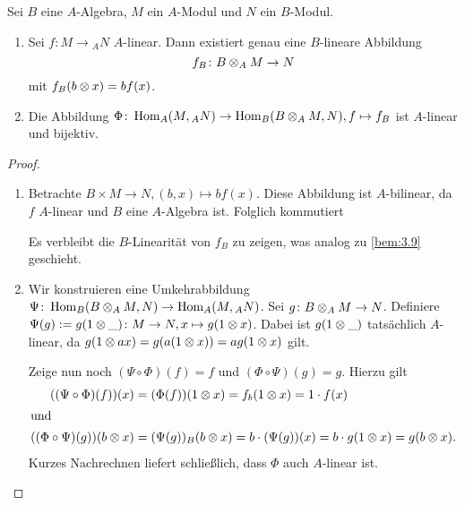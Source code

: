 \documentclass[12pt,a4paper]{scrartcl}
\theoremstyle{cplain}
\theoremstyle{cdef}
\begin{document}
\begin{satz}
	Sei $B$ eine $A$-Algebra, $M$ ein $A$-Modul und $N$ ein $B$-Modul.
	\begin{enumerate}
		\item Sei $f\colon M\to {}_AN$ $A$-linear. Dann existiert genau eine $B$-lineare Abbildung \[f_B\colon B\otimes_AM\to N\] mit $f_B(b\otimes x) = bf(x)$. \label{thm:scalarerweiterung:i}
		\item Die Abbildung $\Phi\colon \operatorname{Hom}_A(M,{}_AN)\to \operatorname{Hom}_B(B\otimes_AM,N), f\mapsto f_B$ ist $A$-linear und bijektiv. \label{thm:scalarerweiterung:ii}
	\end{enumerate}
\end{satz}
\begin{proof}
	\leavevmode
	\begin{enumerate}[label=\ref{thm:scalarerweiterung:\roman*}]
		\item Betrachte $B\times M\to N, (b,x)\mapsto bf(x)$. Diese Abbildung ist $A$-bilinear, da $f$ $A$-linear und $B$ eine $A$-Algebra ist. Folglich kommutiert
		\begin{center}
		\end{center}
		Es verbleibt die $B$-Linearität von $f_B$ zu zeigen, was analog zu \cref{bem:3.9} geschieht.
		\item Wir konstruieren eine Umkehrabbildung $\Psi\colon \operatorname{Hom}_B(B\otimes_AM,N)\to \operatorname{Hom}_A(M,{}_AN)$. Sei $g\colon B\otimes_AM\to N$. Definiere $\Psi(g) := g(1\otimes \_)\colon M\to N, x\mapsto g(1\otimes x)$.
		Dabei ist $g(1\otimes\_)$ tatsächlich $A$-linear, da $g(1\otimes ax ) = g(a(1\otimes x)) = ag(1\otimes x)$ gilt.
		
		Zeige nun noch $(\Psi\circ \Phi)(f) = f$ und $(\Phi\circ\Psi)(g) = g$. Hierzu gilt
		\begin{align*}
			((\Psi\circ\Phi)(f))(x) &= (\Phi(f))(1\otimes x) = f_b(1\otimes x) =1\cdot f(x) \\
			\intertext{und}
			((\Phi\circ\Psi)(g))(b\otimes x) &= (\Psi(g))_B(b\otimes x) = b\cdot (\Psi(g))(x) = b\cdot g(1\otimes x) = g(b\otimes x).
		\end{align*}
		Kurzes Nachrechnen liefert schließlich, dass $\Phi$ auch $A$-linear ist.
		\qedhere
	\end{enumerate}	
\end{proof}
\end{document}
